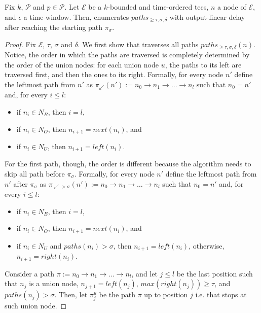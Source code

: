\begin{lemma}\label{lemma:enumeration:process}
  Fix $k$, $\mathcal{P}$ and $p \in \mathcal{P}$. Let $\mathcal{E}$ be a $k$-bounded and time-ordered \acrshort{tecs}, $n$ a node of $\mathcal{E}$, and $\epsilon$ a time-window. Then,  enumerates $paths_{\ge \tau, \sigma, \delta}$ with output-linear delay after reaching the starting path $\pi_{\sigma}$.
\end{lemma}

\begin{proof}
  Fix $\mathcal{E}$, $\tau$, $\sigma$ and $\delta$. We first show that  traverses all paths $paths_{\ge \tau, \sigma, \delta}(n)$. Notice, the order in which the paths are traversed is completely determined by the order of the union nodes: for each union node $u$, the paths to its left are traversed first, and then the ones to its right. Formally, for every node $n'$ define the leftmost path from $n'$ as ${\pi_{\swarrow}(n') := n_{0} \rightarrow n_{1} \rightarrow \ldots \rightarrow n_{l}}$ such that $n_{0} = n'$ and, for every $i \le l$:

  \begin{itemize}
      \item if $n_{i} \in N_{B}$, then $i = l$,
      \item if $n_{i} \in N_{O}$, then $n_{i+1} = next(n_{i})$, and
      \item if $n_{i} \in N_{U}$, then $n_{i+1} = left(n_{i})$.
  \end{itemize}

  For the first path, though, the order is different because the algorithm needs to skip all path before $\pi_{\sigma}$. Formally, for every node $n'$ define the leftmost path from $n'$ after $\pi_{\sigma}$ as ${\pi_{\swarrow > \sigma}(n') := n_{0} \rightarrow n_{1} \rightarrow \ldots \rightarrow n_{l}}$ such that $n_{0} = n'$ and, for every $i \le l$:
  \begin{itemize}
      \item if $n_{i} \in N_{B}$, then $i = l$,
      \item if $n_{i} \in N_{O}$, then $n_{i+1} = next(n_{i})$, and
      \item if $n_{i} \in N_{U}$ and $paths(n_{i}) > \sigma$, then ${n_{i+1} = left(n_{i})}$, otherwise, ${n_{i+1} = right(n_{i})}$.
  \end{itemize}

  Consider a path $\pi := n_{0} \rightarrow n_{1} \rightarrow \ldots \rightarrow n_{l}$, and let $j \leq l$ be the last position such that $n_{j}$ is a union node, $n_{j+1} = left(n_{j})$, $max(right(n_{j})) \ge \tau$, and $paths(n_{j}) > \sigma$. Then, let $\pi^{u}_{j}$ be the path $\pi$ up to position $j$ i.e. that stops at such union node.


\end{proof}
